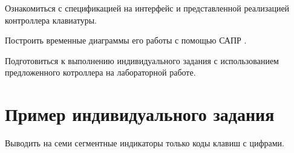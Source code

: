 \par{Ознакомиться с спецификацией на интерфейс  и представленной реализацией контроллера клавиатуры.}

\par{Построить временные диаграммы его работы с помощью САПР .}

\par{Подготовиться к выполнению индивидуального задания с использованием предложенного котроллера на лабораторной работе.}

\section{Пример индивидуального задания}

\par{Выводить на семи сегментные индикаторы только коды клавиш с цифрами.}



